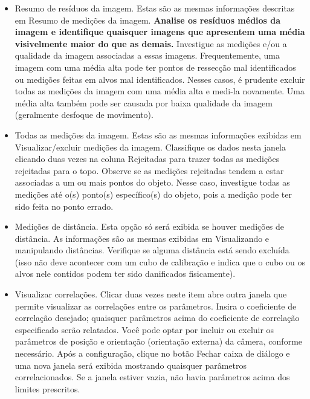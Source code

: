 \documentclass[
  12pt,
  letterpaper,
  DIV=11,
  numbers=noendperiod]{scrreprt}
\providecommand{\tightlist}{%
  \setlength{\itemsep}{0pt}\setlength{\parskip}{0pt}}
\begin{document}
\begin{itemize}
\tightlist
\item
  Resumo de resíduos da imagem. Estas são as mesmas informações
  descritas em Resumo de medições da imagem. \textbf{Analise os resíduos
  médios da imagem e identifique quaisquer imagens que apresentem uma
  média visivelmente maior do que as demais.} Investigue as medições
  e/ou a qualidade da imagem associadas a essas imagens. Frequentemente,
  uma imagem com uma média alta pode ter pontos de ressecção mal
  identificados ou medições feitas em alvos mal identificados. Nesses
  casos, é prudente excluir todas as medições da imagem com uma média
  alta e medi-la novamente. Uma média alta também pode ser causada por
  baixa qualidade da imagem (geralmente desfoque de movimento).
\end{itemize}

\begin{itemize}
\tightlist
\item
  Todas as medições da imagem. Estas são as mesmas informações exibidas
  em Visualizar/excluir medições da imagem. Classifique os dados nesta
  janela clicando duas vezes na coluna Rejeitadas para trazer todas as
  medições rejeitadas para o topo. Observe se as medições rejeitadas
  tendem a estar associadas a um ou mais pontos do objeto. Nesse caso,
  investigue todas as medições até o(s) ponto(s) específico(s) do
  objeto, pois a medição pode ter sido feita no ponto errado.
\end{itemize}

\begin{itemize}
\tightlist
\item
  Medições de distância. Esta opção só será exibida se houver medições
  de distância. As informações são as mesmas exibidas em Visualizando e
  manipulando distâncias. Verifique se alguma distância está sendo
  excluída (isso não deve acontecer com um cubo de calibração e indica
  que o cubo ou os alvos nele contidos podem ter sido danificados
  fisicamente).
\end{itemize}

\begin{itemize}
\tightlist
\item
  Visualizar correlações. Clicar duas vezes neste item abre outra janela
  que permite visualizar as correlações entre os parâmetros. Insira o
  coeficiente de correlação desejado; quaisquer parâmetros acima do
  coeficiente de correlação especificado serão relatados. Você pode
  optar por incluir ou excluir os parâmetros de posição e orientação
  (orientação externa) da câmera, conforme necessário. Após a
  configuração, clique no botão Fechar caixa de diálogo e uma nova
  janela será exibida mostrando quaisquer parâmetros correlacionados. Se
  a janela estiver vazia, não havia parâmetros acima dos limites
  prescritos.
\end{itemize}
\end{document}
